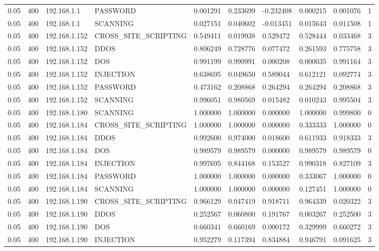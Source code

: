 \begin{tabular}{llllllllll}
0.05 & 400 & 192.168.1.1 & PASSWORD & 0.001291 & 0.233699 & -0.232408 & 0.000215 & 0.001076 & 1 \\
0.05 & 400 & 192.168.1.1 & SCANNING & 0.027151 & 0.040602 & -0.013451 & 0.015643 & 0.011508 & 1 \\
0.05 & 400 & 192.168.1.152 & CROSS\_SITE\_SCRIPTING & 0.549411 & 0.019938 & 0.529472 & 0.528444 & 0.033468 & 3 \\
0.05 & 400 & 192.168.1.152 & DDOS & 0.806249 & 0.728776 & 0.077472 & 0.261593 & 0.775758 & 3 \\
0.05 & 400 & 192.168.1.152 & DOS & 0.991199 & 0.990991 & 0.000208 & 0.000035 & 0.991164 & 3 \\
0.05 & 400 & 192.168.1.152 & INJECTION & 0.638695 & 0.049650 & 0.589044 & 0.612121 & 0.092774 & 3 \\
0.05 & 400 & 192.168.1.152 & PASSWORD & 0.473162 & 0.208868 & 0.264294 & 0.264294 & 0.208868 & 3 \\
0.05 & 400 & 192.168.1.152 & SCANNING & 0.996051 & 0.980569 & 0.015482 & 0.010243 & 0.995504 & 3 \\
0.05 & 400 & 192.168.1.180 & SCANNING & 1.000000 & 1.000000 & 0.000000 & 1.000000 & 0.999800 & 0 \\
0.05 & 400 & 192.168.1.184 & CROSS\_SITE\_SCRIPTING & 1.000000 & 1.000000 & 0.000000 & 0.333333 & 1.000000 & 0 \\
0.05 & 400 & 192.168.1.184 & DDOS & 0.992600 & 0.974000 & 0.018600 & 0.611933 & 0.918333 & 3 \\
0.05 & 400 & 192.168.1.184 & DOS & 0.989579 & 0.989579 & 0.000000 & 0.989579 & 0.989579 & 0 \\
0.05 & 400 & 192.168.1.184 & INJECTION & 0.997695 & 0.844168 & 0.153527 & 0.990318 & 0.827109 & 3 \\
0.05 & 400 & 192.168.1.184 & PASSWORD & 1.000000 & 1.000000 & 0.000000 & 0.333067 & 1.000000 & 0 \\
0.05 & 400 & 192.168.1.184 & SCANNING & 1.000000 & 1.000000 & 0.000000 & 0.127451 & 1.000000 & 0 \\
0.05 & 400 & 192.168.1.190 & CROSS\_SITE\_SCRIPTING & 0.966129 & 0.047419 & 0.918711 & 0.964339 & 0.020322 & 3 \\
0.05 & 400 & 192.168.1.190 & DDOS & 0.252567 & 0.060800 & 0.191767 & 0.003267 & 0.252500 & 3 \\
0.05 & 400 & 192.168.1.190 & DOS & 0.660341 & 0.660169 & 0.000172 & 0.329999 & 0.660272 & 3 \\
0.05 & 400 & 192.168.1.190 & INJECTION & 0.952279 & 0.117394 & 0.834884 & 0.946791 & 0.091625 & 3 \\

\end{tabular}
